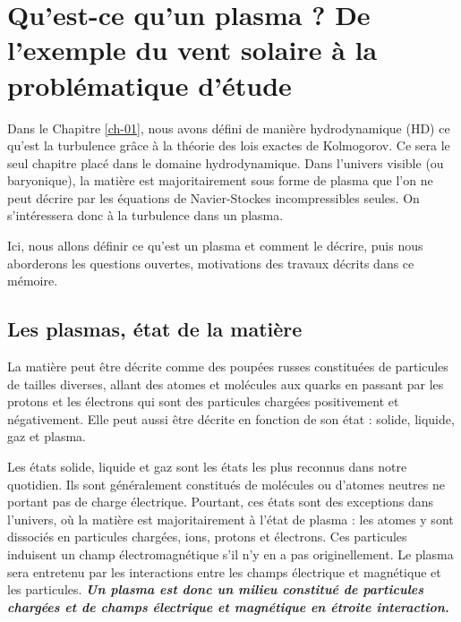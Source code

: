 \chapter{Qu'est-ce qu'un plasma ? De l'exemple du vent solaire à la problématique d'étude}
\renewcommand\partie{\Partie\ Chapitre \thechapter}
\label{ch-02}

\minitoc  

\bigskip

Dans le Chapitre \ref{ch-01}, nous avons défini de manière hydrodynamique (HD) ce qu'est la turbulence grâce à la théorie des lois exactes de Kolmogorov. Ce sera le seul chapitre placé dans le domaine hydrodynamique. Dans l'univers visible (ou baryonique), la matière est majoritairement sous forme de plasma que l'on ne peut décrire par les équations de Navier-Stockes incompressibles seules. On s'intéressera donc à la turbulence dans un plasma. 

Ici, nous allons définir ce qu'est un plasma et comment le décrire, puis nous aborderons les questions ouvertes, motivations des travaux décrits dans ce mémoire. 

\section{Les plasmas, état de la matière} \label{sec-021}

La matière peut être décrite comme des poupées russes constituées de particules de tailles diverses, allant des atomes et molécules aux quarks en passant par les protons et les électrons qui sont des particules chargées positivement et négativement. Elle peut aussi être décrite en fonction de son état : solide, liquide, gaz et plasma. 

Les états solide, liquide et gaz sont les états les plus reconnus dans notre quotidien. Ils sont généralement constitués de molécules ou d'atomes neutres ne portant pas de charge électrique. Pourtant, ces états sont des exceptions dans l'univers, où la matière est majoritairement à l'état de plasma : les atomes y sont dissociés en particules chargées, ions, protons et électrons. Ces particules induisent un champ électromagnétique s'il n'y en a pas originellement. Le plasma sera entretenu par les interactions entre les champs électrique et magnétique et les particules. \textbf{\emph{Un plasma est donc un milieu constitué de particules chargées et de champs électrique et magnétique en étroite interaction.}}

